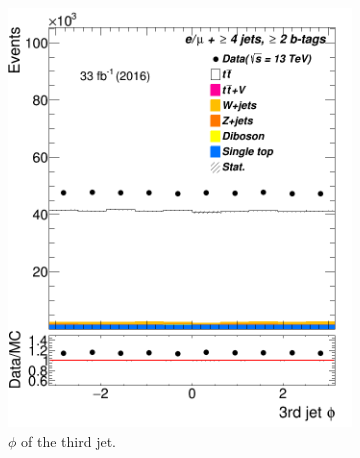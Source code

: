 \begin{figure}
\begin{subfigure}{0.25\textwidth}
		\includegraphics[width=\linewidth]{ControlPlots_emujets_2016_4incl_2incl/jet2_phi_emujets_2016.png}
		\caption{$\phi$  of the third jet.} \label{fig:f3}
	\end{subfigure}\hspace*{1.0cm}
	\begin{subfigure}{0.25\textwidth}

\end{subfigure}
\end{figure}
